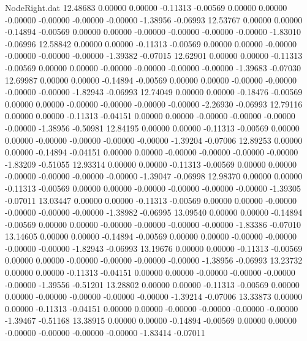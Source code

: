 \begin{filecontents}{NodeRight.dat}
  12.48683    0.00000    0.00000    -0.11313   -0.00569    0.00000    0.00000   -0.00000   -0.00000   -0.00000   -0.00000   -1.38956   -0.06993
  12.53767    0.00000    0.00000    -0.14894   -0.00569    0.00000    0.00000   -0.00000   -0.00000   -0.00000   -0.00000   -1.83010   -0.06996
  12.58842    0.00000    0.00000    -0.11313   -0.00569    0.00000    0.00000   -0.00000   -0.00000   -0.00000   -0.00000   -1.39382   -0.07015
  12.62901    0.00000    0.00000    -0.11313   -0.00569    0.00000    0.00000   -0.00000   -0.00000   -0.00000   -0.00000   -1.39683   -0.07030
  12.69987    0.00000    0.00000    -0.14894   -0.00569    0.00000    0.00000   -0.00000   -0.00000   -0.00000   -0.00000   -1.82943   -0.06993
  12.74049    0.00000    0.00000    -0.18476   -0.00569    0.00000    0.00000   -0.00000   -0.00000   -0.00000   -0.00000   -2.26930   -0.06993
  12.79116    0.00000    0.00000    -0.11313   -0.04151    0.00000    0.00000   -0.00000   -0.00000   -0.00000   -0.00000   -1.38956   -0.50981
  12.84195    0.00000    0.00000    -0.11313   -0.00569    0.00000    0.00000   -0.00000   -0.00000   -0.00000   -0.00000   -1.39204   -0.07006
  12.89253    0.00000    0.00000    -0.14894   -0.04151    0.00000    0.00000   -0.00000   -0.00000   -0.00000   -0.00000   -1.83209   -0.51055
  12.93314    0.00000    0.00000    -0.11313   -0.00569    0.00000    0.00000   -0.00000   -0.00000   -0.00000   -0.00000   -1.39047   -0.06998
  12.98370    0.00000    0.00000    -0.11313   -0.00569    0.00000    0.00000   -0.00000   -0.00000   -0.00000   -0.00000   -1.39305   -0.07011
  13.03447    0.00000    0.00000    -0.11313   -0.00569    0.00000    0.00000   -0.00000   -0.00000   -0.00000   -0.00000   -1.38982   -0.06995
  13.09540    0.00000    0.00000    -0.14894   -0.00569    0.00000    0.00000   -0.00000   -0.00000   -0.00000   -0.00000   -1.83386   -0.07010
  13.14605    0.00000    0.00000    -0.14894   -0.00569    0.00000    0.00000   -0.00000   -0.00000   -0.00000   -0.00000   -1.82943   -0.06993
  13.19676    0.00000    0.00000    -0.11313   -0.00569    0.00000    0.00000   -0.00000   -0.00000   -0.00000   -0.00000   -1.38956   -0.06993
  13.23732    0.00000    0.00000    -0.11313   -0.04151    0.00000    0.00000   -0.00000   -0.00000   -0.00000   -0.00000   -1.39556   -0.51201
  13.28802    0.00000    0.00000    -0.11313   -0.00569    0.00000    0.00000   -0.00000   -0.00000   -0.00000   -0.00000   -1.39214   -0.07006
  13.33873    0.00000    0.00000    -0.11313   -0.04151    0.00000    0.00000   -0.00000   -0.00000   -0.00000   -0.00000   -1.39467   -0.51168
  13.38915    0.00000    0.00000    -0.14894   -0.00569    0.00000    0.00000   -0.00000   -0.00000   -0.00000   -0.00000   -1.83414   -0.07011

\end{filecontents}
